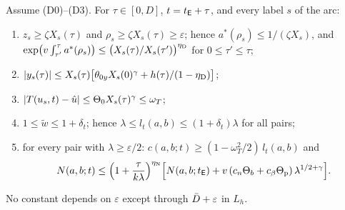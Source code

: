 \begin{theorem}\label{thm:T3-D}
Assume \textup{(D0)--(D3)}. For $\tau\in[0,D]$, $t=t_{\mathsf E}+\tau$, and every label $s$ of the arc:
\begin{enumerate}
\item[(i)] $z_s\ge\zeta X_s(\tau)$ and $\rho_s\ge\zeta X_s(\tau)\ge\varepsilon$; hence $a^*(\rho_s)\le1/(\zeta X_s)$, and
$\exp\bigl(v\int_{\tau'}^\tau a^*(\rho_s)\bigr)\le\bigl(X_s(\tau)/X_s(\tau')\bigr)^{\eta_{\mathrm D}}$ for $0\le\tau'\le\tau$;
\item[(ii)] $|y_s(\tau)|\le X_s(\tau)\bigl[\theta_{0y}X_s(0)^\gamma+h(\tau)/(1-\eta_{\mathrm D})\bigr]$;
\item[(iii)] $|T(u_s,t)-\hat u|\le\Theta_0X_s(\tau)^\gamma\le\omega_T$;
\item[(iv)] $1\le\tilde w\le1+\delta_t$; hence $\lambda\le l_t(a,b)\le(1+\delta_t)\lambda$ for all pairs;
\item[(v)] for every pair with $\lambda\ge\varepsilon/2$: $c(a,b;t)\ge(1-\omega_T^2/2)\,l_t(a,b)$ and
\[
N(a,b;t)\le\Bigl(1+\frac\tau{k\lambda}\Bigr)^{\eta_{\mathrm N}}\Bigl[N(a,b;t_{\mathsf E})+v\,(c_n\Theta_b+c_\beta\Theta_{\mathrm p})\,\lambda^{1/2+\gamma}\Bigr].
\]
\end{enumerate}
No constant depends on $\varepsilon$ except through $\bar D+\varepsilon$ in $L_h$.
\end{theorem}
